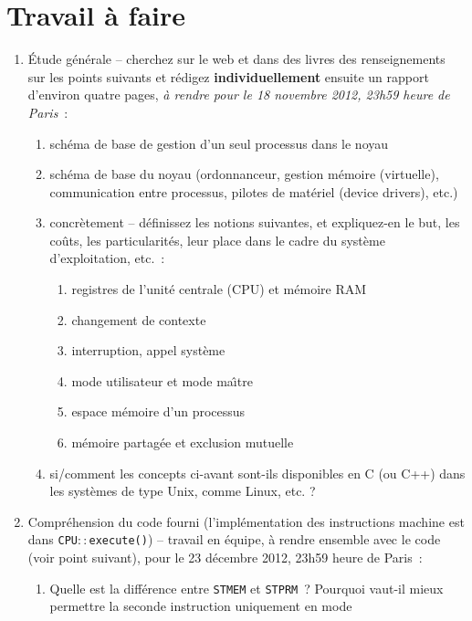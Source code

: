 \documentclass{article}
\begin{document}
\begin{itemize}
\end{itemize}

\section{Travail \`a faire}

\begin{enumerate}
\item \'Etude g\'en\'erale -- cherchez sur le web et dans des livres des
  renseignements sur les points suivants et r\'edigez
  \textbf{individuellement} ensuite un rapport d'environ
  quatre pages, \textit{\`a rendre pour le 18 novembre 2012, 23h59 heure de Paris}~:
\begin{enumerate}
 \item sch\'ema de base de gestion d'un seul processus dans le noyau
\item sch\'ema de base du noyau (ordonnanceur, gestion m\'emoire
  (virtuelle), communication entre processus, pilotes de mat\'eriel (device
  drivers), etc.)
\item concr\`etement -- d\'efinissez les notions suivantes, et expliquez-en le
  but, les co\^uts, les particularit\'es, leur place dans le cadre du
  syst\`eme d'exploitation, etc.~:
\begin{enumerate}
\item registres de l'unit\'e centrale (CPU) et m\'emoire RAM
\item changement de contexte
\item interruption, appel syst\`eme
\item mode utilisateur et mode ma\^\i tre
\item  espace m\'emoire d'un processus
\item m\'emoire partag\'ee et exclusion mutuelle
\end{enumerate}
\item si/comment les concepts ci-avant sont-ils disponibles en C (ou C++) dans
  les syst\`emes de type Unix, comme Linux, etc. ?
\end{enumerate}
\item Compr\'ehension du code fourni (l'impl\'ementation des instructions
  machine est dans \texttt{CPU$::$execute()}) -- travail en \'equipe, \`a
  rendre ensemble avec le code (voir point suivant), pour le 23 d\'ecembre
  2012, 23h59 heure de Paris~:
\begin{enumerate}
\item Quelle est la diff\'erence entre \texttt{STMEM} et \texttt{STPRM}~?
  Pourquoi vaut-il mieux permettre la seconde instruction uniquement en mode

\end{enumerate}
\end{enumerate}
\end{document}
